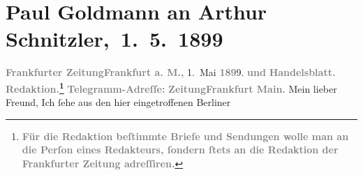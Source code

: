 

         
         \renewcommand{\erwaehntePersonen}{Personen: Marie Reinhard}
         \renewcommand{\erwaehnteInstitutionen}{Institutionen: Frankfurter Zeitung}
         \renewcommand{\erwaehnteOrte}{Orte: Berlin, Den Haag, Deutsches Theater Berlin, Frankfurt am Main, Graz, Wien}
         \renewcommand{\erwaehnteWerke}{Werke: Der grüne Kakadu – Paracelsus – Die Gefährtin. Drei Einakter, Der grüne Kakadu. Groteske in einem Akt}
               \section[ Paul Goldmann an Arthur Schnitzler, 1. 5. 1899]{ Paul Goldmann an Arthur Schnitzler, 1. 5. 1899}\nopagebreak{}\rehead{ }\begin{ledgroupsized}[t]{13cm}\normalsize\beginnumbering \toendnotes[C]{\smallbreak\pagebreak[2]} 
\toendnotes[C]{\smallbreak}\pstart
           \noindent{}{\pb}\textcolor{gray}{\textbf{\textbf{Frankfurter Zeitung}}}\hfill \textcolor{gray}{\textbf{\textbf{Frankfurt a. M.,}}}{ }1. Mai \textcolor{gray}{\textbf{189}}9.\pend
           \pstart
           \textcolor{gray}{\textbf{und}}\pend
           \pstart
           \textcolor{gray}{\textbf{Handelsblatt.}}\pend
           \pstart
           \textcolor{gray}{\textbf{\textbf{Redaktion.}\footnote{\noindent{}\textcolor{gray}{\textbf{Für die Redaktion beſtimmte Briefe und Sendungen wolle man
                                  an die Perſon eines Redakteurs,
                              ſondern ſtets \textbf{an die Redaktion der Frankfurter Zeitung} adreſſiren.}}}}}\pend
           \pstart
           \textcolor{gray}{\textbf{Telegramm-Adreſſe:}}\pend
           \pstart
           \textcolor{gray}{\textbf{\textbf{ZeitungFrankfurt Main.}}}\pend
           \pstart{}Mein lieber Freund,\pend\pstart
           Ich ſehe aus den hier eingetroffenen Berliner

\end{ledgroupsized}
